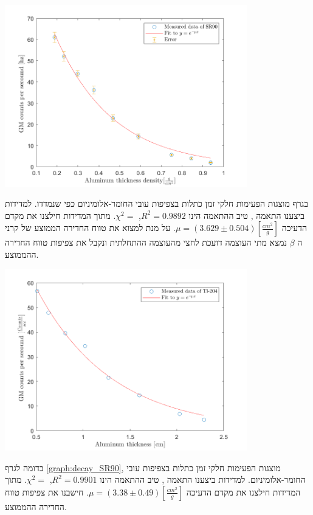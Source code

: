 \documentclass{article}
\begin{document}
\begin{graph}[ht!]
    \centering
    \includegraphics[width=0.79\textwidth]{SR90.png}
    \caption{
    }
    \label{graph:decay_SR90}
\end{graph}
 בגרף מוצגות הפעימות חלקי זמן כתלות בצפיפות עובי החומר-אלומיניום כפי שנמדדו.
 למדידות ביצענו התאמה ,
 טיב ההתאמה הינו 
 $R^2 = 0.9892$,
 $\chi^2=$.
 מתוך המדידות חילצנו את מקדם הדעיכה
 $\mu = (3.629 \pm 0.504) [\frac{cm^2}{g}]$.
 על מנת למצוא את
טווח החדירה הממוצע של קרני ה
$\beta$
 נמצא מתי העוצמה דועכת לחצי מהעוצמה ההתחלתית ונקבל את צפיפות טווח החדירה ההממוצע.



\begin{graph}[ht!]
    \centering
    \includegraphics[width=0.79\textwidth]{Tl-204.png}
    \caption{
    }
    \label{graph:decay_Tl-204}
\end{graph}

 בדומה לגרף 
 \ref{graph:decay_SR90},
 מוצגות הפעימות חלקי זמן כתלות בצפיפות עובי החומר-אלומיניום.
 למדידות ביצענו התאמה ,
 טיב ההתאמה הינו 
 $R^2 = 0.9901$,
 $\chi^2=$.
 מתוך המדידות חילצנו את מקדם הדעיכה
 $\mu = (3.38 \pm 0.49) [\frac{cm^2}{g}]$.
חישבנו את צפיפות טווח החדירה ההממוצע.
\end{document}
